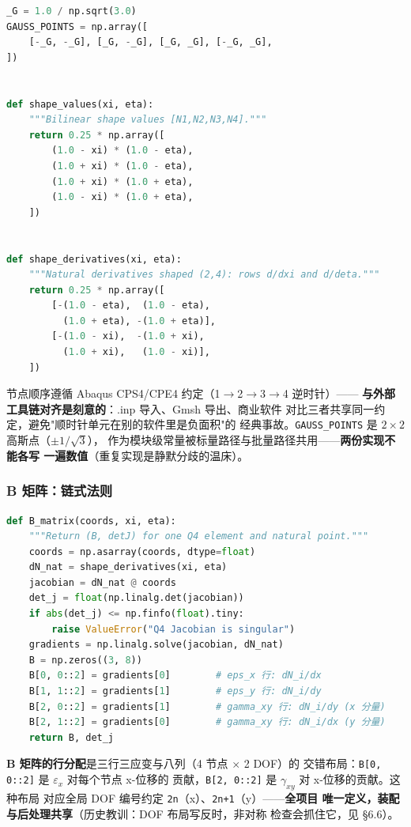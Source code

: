 \documentclass[12pt,a4paper]{ctexart}
\newcommand{\fem}{\Verb}
\begin{document}
\begin{lstlisting}[language=python]
_G = 1.0 / np.sqrt(3.0)
GAUSS_POINTS = np.array([
    [-_G, -_G], [_G, -_G], [_G, _G], [-_G, _G],
])


def shape_values(xi, eta):
    """Bilinear shape values [N1,N2,N3,N4]."""
    return 0.25 * np.array([
        (1.0 - xi) * (1.0 - eta),
        (1.0 + xi) * (1.0 - eta),
        (1.0 + xi) * (1.0 + eta),
        (1.0 - xi) * (1.0 + eta),
    ])


def shape_derivatives(xi, eta):
    """Natural derivatives shaped (2,4): rows d/dxi and d/deta."""
    return 0.25 * np.array([
        [-(1.0 - eta),  (1.0 - eta),
          (1.0 + eta), -(1.0 + eta)],
        [-(1.0 - xi),  -(1.0 + xi),
          (1.0 + xi),   (1.0 - xi)],
    ])
\end{lstlisting}

节点顺序遵循 Abaqus CPS4/CPE4 约定（1$\to$2$\to$3$\to$4 逆时针）——
\textbf{与外部工具链对齐是刻意的}：.inp 导入、Gmsh 导出、商业软件
对比三者共享同一约定，避免"顺时针单元在别的软件里是负面积"的
经典事故。\fem|GAUSS_POINTS| 是 $2\times2$ 高斯点（$\pm 1/\sqrt{3}$），
作为模块级常量被标量路径与批量路径共用——\textbf{两份实现不能各写
一遍数值}（重复实现是静默分歧的温床）。

\subsubsection{B 矩阵：链式法则}

\begin{lstlisting}[language=python]
def B_matrix(coords, xi, eta):
    """Return (B, detJ) for one Q4 element and natural point."""
    coords = np.asarray(coords, dtype=float)
    dN_nat = shape_derivatives(xi, eta)
    jacobian = dN_nat @ coords
    det_j = float(np.linalg.det(jacobian))
    if abs(det_j) <= np.finfo(float).tiny:
        raise ValueError("Q4 Jacobian is singular")
    gradients = np.linalg.solve(jacobian, dN_nat)
    B = np.zeros((3, 8))
    B[0, 0::2] = gradients[0]        # eps_x 行: dN_i/dx
    B[1, 1::2] = gradients[1]        # eps_y 行: dN_i/dy
    B[2, 0::2] = gradients[1]        # gamma_xy 行: dN_i/dy (x 分量)
    B[2, 1::2] = gradients[0]        # gamma_xy 行: dN_i/dx (y 分量)
    return B, det_j
\end{lstlisting}

\textbf{B 矩阵的行分配}是三行三应变与八列（4 节点 $\times$ 2 DOF）的
交错布局：\fem|B[0, 0::2]| 是 $\varepsilon_x$ 对每个节点 x-位移的
贡献，\fem|B[2, 0::2]| 是 $\gamma_{xy}$ 对 x-位移的贡献。这种布局
对应全局 DOF 编号约定 \fem|2n|（x）、\fem|2n+1|（y）——\textbf{全项目
唯一定义，装配与后处理共享}（历史教训：DOF 布局写反时，非对称
检查会抓住它，见 §6.6）。
\end{document}
